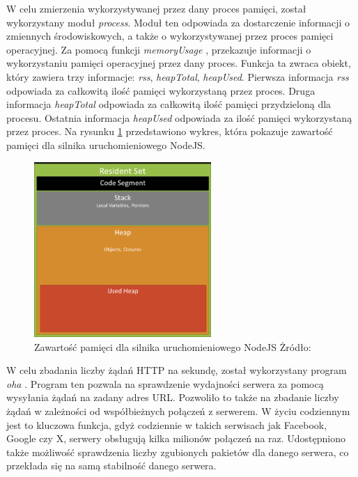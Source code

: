 W celu zmierzenia wykorzystywanej przez dany proces pamięci, został wykorzystany moduł \textit{process}. Moduł ten odpowiada za dostarczenie informacji o zmiennych środowiskowych, a także o wykorzystywanej przez proces pamięci operacyjnej. Za pomocą funkcji \textit{memoryUsage} \cite{memoryUsage} \cite{memoryUsageImage}, przekazuje informacji o wykorzystaniu pamięci operacyjnej przez dany proces. Funkcja ta zwraca obiekt, który zawiera trzy informacje: \textit{rss}, \textit{heapTotal}, \textit{heapUsed}. Pierwsza informacja \textit{rss} odpowiada za całkowitą ilość pamięci wykorzystaną przez proces. Druga informacja \textit{heapTotal} odpowiada za całkowitą ilość pamięci przydzieloną dla procesu. Ostatnia informacja \textit{heapUsed} odpowiada za ilość pamięci wykorzystaną przez proces. Na rysunku \ref{fig:memory} przedstawiono wykres, która pokazuje zawartość pamięci dla silnika uruchomieniowego NodeJS.

\begin{figure}[h]
  \centering
  \includegraphics[width=0.6\textwidth]{Figures/memoryUsage.png}
  \caption{Zawartość pamięci dla silnika uruchomieniowego NodeJS Żródło: \cite{memoryUsageImage}}
  \label{fig:memory}
\end{figure}

W celu zbadania liczby żądań HTTP na sekundę, został wykorzystany program \textit{oha} \cite{oha}. Program ten pozwala na sprawdzenie wydajności serwera za pomocą wysyłania żądań na zadany adres URL. Pozwoliło to także na zbadanie liczby żądań w zależności od współbieżnych połączeń z serwerem. W życiu codziennym jest to kluczowa funkcja, gdyż codziennie w takich serwisach jak Facebook, Google czy X, serwery obsługują kilka milionów połączeń na raz. Udostępniono także możliwość sprawdzenia liczby zgubionych pakietów dla danego serwera, co przekłada się na samą stabilność danego serwera.
